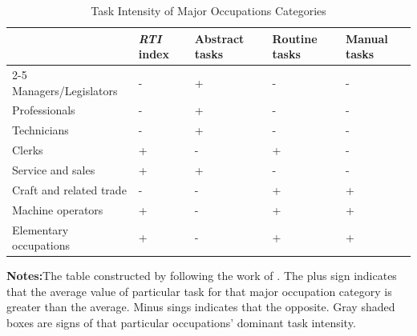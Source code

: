 \begin{table}[H]
\caption{\label{tab:Summary_task_intensities}Task Intensity of Major Occupations
Categories}

\begin{centering}
\begin{tabular}{l>{\centering}p{1cm}>{\centering}p{2cm}>{\centering}p{2cm}>{\centering}p{2cm}}
\toprule 
 & \emph{RTI }index & Abstract tasks & Routine tasks & Manual tasks\tabularnewline
\cmidrule{2-5} \cmidrule{3-5} \cmidrule{4-5} \cmidrule{5-5} 
Managers/Legislators & - & \cellcolor[gray]{0.75}+ & - & -\tabularnewline
Professionals & - & \cellcolor[gray]{0.75}+ & - & -\tabularnewline
Technicians & - & \cellcolor[gray]{0.75}+ & - & -\tabularnewline
Clerks & + & - & \cellcolor[gray]{0.75}+ & -\tabularnewline
Service and sales & + & \cellcolor[gray]{0.75}+ & - & -\tabularnewline
Craft and related trade & - & - & + & \cellcolor[gray]{0.75}+\tabularnewline
Machine operators & + & - & \cellcolor[gray]{0.75}+ & +\tabularnewline
Elementary occupations & + & - & + & \cellcolor[gray]{0.75}+\tabularnewline
\bottomrule
\end{tabular}
\par\end{centering}
\medskip

\textbf{Notes:}The table constructed by following the work of \citet{2013Autor}.
The plus sign indicates that the average value of particular task
for that major occupation category is greater than the average. Minus
sings indicates that the opposite. Gray shaded boxes are signs of
that particular occupations' dominant task intensity.
\end{table}
